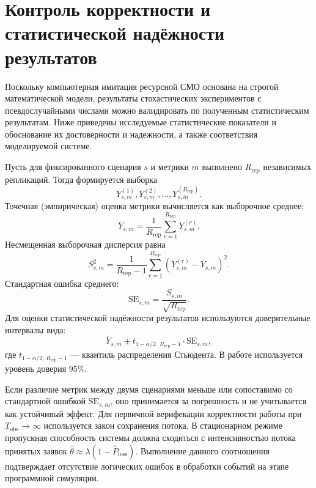 \section{Контроль корректности и статистической надёжности результатов}
\label{sec:verification}

Поскольку компьютерная имитация ресурсной СМО основана на строгой математической модели, результаты стохастических экспериментов с псевдослучайными числами можно валидировать по полученным статистическим результатам\cite{law2015_simulation_modeling,welch1983_statistical_analysis_simulation}. Ниже приведены исследуемые статистические показатели и обоснование их достоверности и надежности, а также соответствия моделируемой системе. 

Пусть для фиксированного сценария $s$ и метрики $m$ выполнено $R_{\mathrm{rep}}$ независимых репликаций\cite{fishman1996_monte_carlo,law2015_simulation_modeling}. Тогда формируется выборка
$$
Y_{s,m}^{(1)},Y_{s,m}^{(2)},\dots,Y_{s,m}^{(R_{\mathrm{rep}})}.
$$
Точечная (эмпирическая) оценка метрики вычисляется как выборочное среднее:
$$
\overline{Y}_{s,m}
=
\frac{1}{R_{\mathrm{rep}}}
\sum_{r=1}^{R_{\mathrm{rep}}}Y_{s,m}^{(r)}.
$$
Несмещенная выборочная дисперсия равна
$$
S_{s,m}^2
=
\frac{1}{R_{\mathrm{rep}}-1}
\sum_{r=1}^{R_{\mathrm{rep}}}
\left(
Y_{s,m}^{(r)}-\overline{Y}_{s,m}
\right)^2.
$$
Стандартная ошибка среднего:
$$
\mathrm{SE}_{s,m}
=
\frac{S_{s,m}}{\sqrt{R_{\mathrm{rep}}}}.
$$
Для оценки статистической надёжности результатов используются доверительные интервалы вида: 
$$
\overline{Y}_{s,m}
\pm
t_{1-\alpha/2,\,R_{\mathrm{rep}}-1}
\cdot
\mathrm{SE}_{s,m},
$$
где $t_{1-\alpha/2,\,R_{\mathrm{rep}}-1}$ --- квантиль распределения Стьюдента. В работе используется уровень доверия $95\%$\cite{student1908_probable_error_mean}.  

Если различие метрик между двумя сценариями меньше или сопоставимо со стандартной ошибкой $\mathrm{SE}_{s,m}$, оно принимается за погрешность и не учитывается как устойчивый эффект\cite{law2015_simulation_modeling,welch1983_statistical_analysis_simulation}. Для первичной верифекации корректности работы при $T_{\text{obs}} \to \infty$ используется закон сохранения потока\cite{bocharov_pechinkin_tmo,adan_resing2015_queueing_systems}. В стационарном режиме пропускная способность системы должна сходиться с интенсивностью потока принятых заявок $\widehat{\theta} \approx \lambda(1-\widehat{P}_{\mathrm{loss}}).$ Выполнение данного соотношения подтверждает отсутствие логических ошибок в обработки событий на этапе программной симуляции. 

